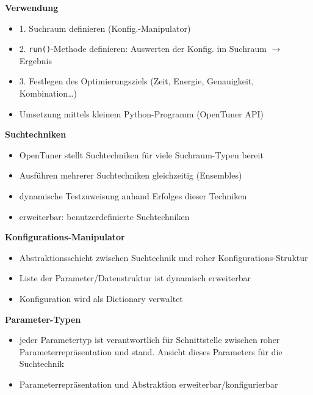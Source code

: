   \begin{frame}
  \textbf{Verwendung}
  \begin{itemize}
    \item 1. Suchraum definieren (Konfig.-Manipulator)
    \item 2. \texttt{run()}-Methode definieren: Auswerten der Konfig. im Suchraum $\rightarrow$ Ergebnis
    \item 3. Festlegen des Optimierungsziels (Zeit, Energie, Genauigkeit, Kombination…)
    \item Umsetzung mittels kleinem Python-Programm (OpenTuner API)
  \end{itemize}
  \textbf{Suchtechniken}
  \begin{itemize}
    \item OpenTuner stellt Suchtechniken für viele Suchraum-Typen bereit
    \item Ausführen mehrerer Suchtechniken gleichzeitig (Ensembles)
    \item dynamische Testzuweisung anhand Erfolges dieser Techniken
    \item erweiterbar: benutzerdefinierte Suchtechniken
  \end{itemize}
  \end{frame}
  


  \begin{frame}
  \textbf{Konfigurations-Manipulator}
  \begin{itemize}
    \item Abstraktionsschicht zwischen Suchtechnik und roher Konfigurations-Struktur
    \item Liste der Parameter/Datenstruktur ist dynamisch erweiterbar
    \item Konfiguration wird als Dictionary verwaltet \newline
  \end{itemize}
  \textbf{Parameter-Typen}
  \begin{itemize}
    \item jeder Parametertyp ist verantwortlich für Schnittstelle zwischen roher 
    Parameterrepräsentation und stand. Ansicht dieses Parameters für die Suchtechnik
    \item Parameterrepräsentation und Abstraktion erweiterbar/konfigurierbar
  \end{itemize}
  \end{frame}
  
